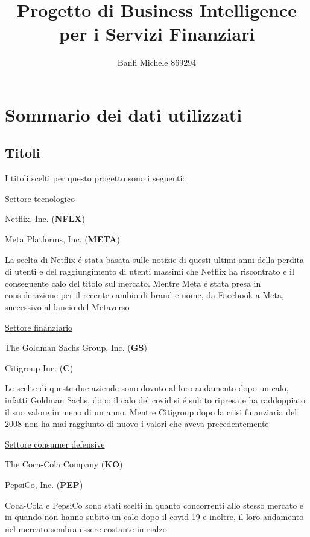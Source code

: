 \documentclass{report}
\title{Progetto di Business Intelligence per i Servizi Finanziari}
\author{Banfi Michele 869294}
\begin{document}
\maketitle

\chapter{Sommario dei dati utilizzati}
\section{Titoli}
I titoli scelti per questo progetto sono i seguenti:

\noindent \underline{Settore tecnologico}

Netflix, Inc. (\textbf{NFLX})

Meta Platforms, Inc. (\textbf{META})

\noindent La scelta di Netflix é stata basata sulle notizie di questi ultimi anni della perdita di utenti e del raggiungimento di utenti massimi che Netflix ha riscontrato e il conseguente calo del titolo sul mercato. Mentre Meta é stata presa in considerazione per il recente cambio di brand e nome, da Facebook a Meta, successivo al lancio del Metaverso

\noindent \underline{Settore finanziario}

The Goldman Sachs Group, Inc. (\textbf{GS})

Citigroup Inc. (\textbf{C})

\noindent Le scelte di queste due aziende sono dovuto al loro andamento dopo un calo, infatti Goldman Sachs, dopo il calo del covid si é subito ripresa e ha raddoppiato il suo valore in meno di un anno. Mentre Citigroup dopo la crisi finanziaria del 2008 non ha mai raggiunto di nuovo i valori che aveva precedentemente

\noindent \underline{Settore consumer defensive}

The Coca-Cola Company (\textbf{KO})

PepsiCo, Inc. (\textbf{PEP})

Coca-Cola e PepsiCo sono stati scelti in quanto concorrenti allo stesso mercato e in quando non hanno subito un calo dopo il covid-19 e inoltre, il loro andamento nel mercato sembra essere costante in rialzo.
\end{document}
